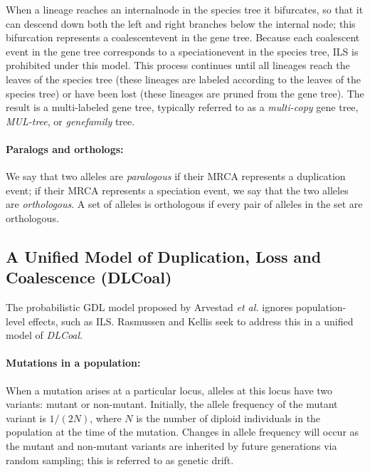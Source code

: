 When a lineage reaches an \gls{internalnode} in the species tree it bifurcates, so that it can descend down both the left and right branches below the internal node; this bifurcation represents a \gls{coalescentevent} in the gene tree.
Because each coalescent event in the gene tree corresponds to a \gls{speciationevent} in the species tree, \gls{ILS} is prohibited under this model.
This process continues until all lineages reach the leaves of the species tree (these lineages are labeled according to the leaves of the species tree) or have been lost (these lineages are pruned from the gene tree).
The result is a \gls{multi-labeled} gene tree, typically referred to as a \textit{\gls{multi-copy}} gene tree, \textit{\gls{MUL-tree}}, or \textit{\gls{genefamily}} tree.

\paragraph{Paralogs and orthologs:}
We say that two alleles are \textit{\gls{paralogous}} if their \gls{MRCA} represents a duplication event; if their MRCA represents a speciation event, we say that the two alleles are \textit{\gls{orthologous}}.
A set of alleles is orthologous if every pair of alleles in the set are orthologous. 

\subsection{A Unified Model of Duplication, Loss and Coalescence (DLCoal)}
\label{sec:background-dlcoal}
The probabilistic \gls{GDL} model proposed by Arvestad {\em et al.} \cite{arvestad2003bayesian} ignores population-level effects, such as \gls{ILS}.
Rasmussen and Kellis \cite{rasmussen2012unified} seek to address this in a unified model of \textit{\gls{DLCoal}}.

\paragraph{Mutations in a population:} 
When a mutation arises at a particular \gls{locus}, \glspl{allele} at this locus have two variants: mutant or non-mutant.
Initially, the allele frequency of the mutant variant is $1/(2 N)$, where $N$ is the number of diploid individuals in the population at the time of the mutation.
Changes in allele frequency will occur as the mutant and non-mutant variants are inherited by future generations via random sampling; this is referred to as genetic drift.


